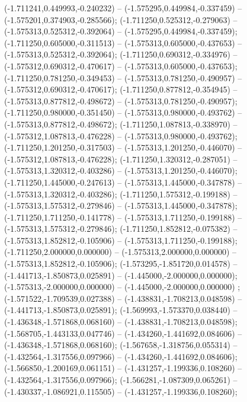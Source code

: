  (-1.711241,0.449993,-0.240232) -- (-1.575295,0.449984,-0.337459) -- (-1.575201,0.374903,-0.285566);
 (-1.711250,0.525312,-0.279063) -- (-1.575313,0.525312,-0.392064) -- (-1.575295,0.449984,-0.337459);
 (-1.711250,0.605000,-0.311513) -- (-1.575313,0.605000,-0.437653) -- (-1.575313,0.525312,-0.392064);
 (-1.711250,0.690312,-0.334976) -- (-1.575312,0.690312,-0.470617) -- (-1.575313,0.605000,-0.437653);
 (-1.711250,0.781250,-0.349453) -- (-1.575313,0.781250,-0.490957) -- (-1.575312,0.690312,-0.470617);
 (-1.711250,0.877812,-0.354945) -- (-1.575313,0.877812,-0.498672) -- (-1.575313,0.781250,-0.490957);
 (-1.711250,0.980000,-0.351450) -- (-1.575313,0.980000,-0.493762) -- (-1.575313,0.877812,-0.498672);
 (-1.711250,1.087813,-0.338970) -- (-1.575312,1.087813,-0.476228) -- (-1.575313,0.980000,-0.493762);
 (-1.711250,1.201250,-0.317503) -- (-1.575313,1.201250,-0.446070) -- (-1.575312,1.087813,-0.476228);
 (-1.711250,1.320312,-0.287051) -- (-1.575313,1.320312,-0.403286) -- (-1.575313,1.201250,-0.446070);
 (-1.711250,1.445000,-0.247613) -- (-1.575313,1.445000,-0.347878) -- (-1.575313,1.320312,-0.403286);
 (-1.711250,1.575312,-0.199188) -- (-1.575313,1.575312,-0.279846) -- (-1.575313,1.445000,-0.347878);
 (-1.711250,1.711250,-0.141778) -- (-1.575313,1.711250,-0.199188) -- (-1.575313,1.575312,-0.279846);
 (-1.711250,1.852812,-0.075382) -- (-1.575313,1.852812,-0.105906) -- (-1.575313,1.711250,-0.199188);
 (-1.711250,2.000000,0.000000) -- (-1.575313,2.000000,0.000000) -- (-1.575313,1.852812,-0.105906);
 (-1.573295,-1.851720,0.014578) -- (-1.441713,-1.850873,0.025891) -- (-1.445000,-2.000000,0.000000);
 (-1.575313,-2.000000,0.000000) -- (-1.445000,-2.000000,0.000000) ;
 (-1.571522,-1.709539,0.027388) -- (-1.438831,-1.708213,0.048598) -- (-1.441713,-1.850873,0.025891);
 (-1.569993,-1.573370,0.038440) -- (-1.436348,-1.571868,0.068160) -- (-1.438831,-1.708213,0.048598);
 (-1.568705,-1.443133,0.047746) -- (-1.434260,-1.441692,0.084606) -- (-1.436348,-1.571868,0.068160);
 (-1.567658,-1.318756,0.055314) -- (-1.432564,-1.317556,0.097966) -- (-1.434260,-1.441692,0.084606);
 (-1.566850,-1.200169,0.061151) -- (-1.431257,-1.199336,0.108260) -- (-1.432564,-1.317556,0.097966);
 (-1.566281,-1.087309,0.065261) -- (-1.430337,-1.086921,0.115505) -- (-1.431257,-1.199336,0.108260);
